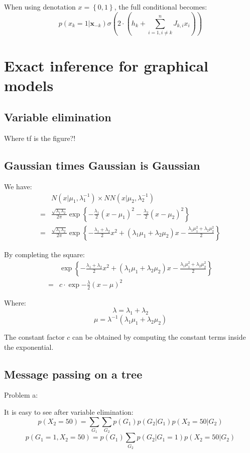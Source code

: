 \documentclass[UTF8]{ctexart}
\begin{document}
When using denotation $x=\left\{ 0,1 \right\}$, the full conditional becomes:
$$p(x_{k}=1|\textbf{x}_{-k})\sigma(2\cdot (h_{k}+\sum_{i=1,i\neq k}^{n}J_{k,i}x_{i})) $$

\newpage
\section{Exact inference for graphical models}
\subsection{Variable elimination}
Where tf is the figure?!

\subsection{Gaussian times Gaussian is Gaussian}
We have:
\begin{align}
\ &N(x|\mu_{1},\lambda_{1}^{-1})\times N{N}(x|\mu_{2},\lambda_{2}^{-1})\nonumber \\
 =&\frac{\sqrt{\lambda_{1}\lambda_{2}}}{2\pi}\exp\left\{ -\frac{\lambda_{1}}{2}(x-\mu_{1})^{2}-\frac{\lambda_{2}}{2}(x-\mu_{2})^{2}  \right\}\nonumber \\
=& \frac{\sqrt{\lambda_{1}\lambda_{2}}}{2\pi} \exp\left\{ -\frac{\lambda_{1}+\lambda_{2}}{2}x^{2}+(\lambda_{1}\mu_{1}+\lambda_{2}\mu_{2})x-\frac{\lambda_{1}\mu_{1}^{2}+\lambda_{2}\mu_{2}^{2}}{2} \right\}  \nonumber
\end{align}

By completing the square:
\begin{align}
\ &\exp\left\{ -\frac{\lambda_{1}+\lambda_{2}}{2}x^{2}+(\lambda_{1}\mu_{1}+\lambda_{2}\mu_{2})x-\frac{\lambda_{1}\mu_{1}^{2}+\lambda_{2}\mu_{2}^{2}}{2} \right\} \nonumber \\
=&c\cdot \exp{-\frac{\lambda}{2}(x-\mu)^{2}}\nonumber
\end{align}

Where:
$$\lambda = \lambda_{1}+\lambda_{2}$$
$$\mu = \lambda^{-1}(\lambda_{1}\mu_{1}+\lambda_{2}\mu_{2})$$

The constant factor $c$ can be obtained by computing the constant terms inside the exponential.

\subsection{Message passing on a tree}
Problem a:

It is easy to see after variable elimination:
$$p(X_{2}=50) = \sum_{G_{1}}\sum_{G_{2}}p(G_{1})p(G_{2}|G_{1})p(X_{2}=50|G_{2})$$
$$p(G_{1}=1,X_{2}=50)=p(G_{1})\sum_{G_{2}}p(G_{2}|G_{1}=1)p(X_{2}=50|G_{2})$$
\end{document}
